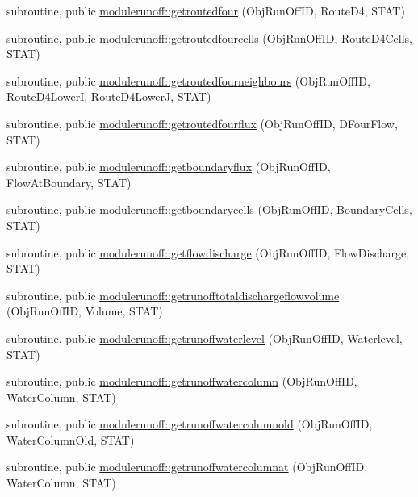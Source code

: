 \begin{DoxyCompactItemize}
\item 
subroutine, public \mbox{\hyperlink{namespacemodulerunoff_a092094d64e7a0ff361f536ab75f67317}{modulerunoff\+::getroutedfour}} (Obj\+Run\+Off\+ID, Route\+D4, S\+T\+AT)
\item 
subroutine, public \mbox{\hyperlink{namespacemodulerunoff_ad1eea51d0c7cb95a4e235e18dad99861}{modulerunoff\+::getroutedfourcells}} (Obj\+Run\+Off\+ID, Route\+D4\+Cells, S\+T\+AT)
\item 
subroutine, public \mbox{\hyperlink{namespacemodulerunoff_a012d41440fbbe25a6de0417a150502fd}{modulerunoff\+::getroutedfourneighbours}} (Obj\+Run\+Off\+ID, Route\+D4\+LowerI, Route\+D4\+LowerJ, S\+T\+AT)
\item 
subroutine, public \mbox{\hyperlink{namespacemodulerunoff_a8e2e0bbd121e81c889fd2cd186c45b5c}{modulerunoff\+::getroutedfourflux}} (Obj\+Run\+Off\+ID, D\+Four\+Flow, S\+T\+AT)
\item 
subroutine, public \mbox{\hyperlink{namespacemodulerunoff_aa5c3e304953e0e305461bb0ef472e0f8}{modulerunoff\+::getboundaryflux}} (Obj\+Run\+Off\+ID, Flow\+At\+Boundary, S\+T\+AT)
\item 
subroutine, public \mbox{\hyperlink{namespacemodulerunoff_a94d1c021f061e9cfa1f07c3845541525}{modulerunoff\+::getboundarycells}} (Obj\+Run\+Off\+ID, Boundary\+Cells, S\+T\+AT)
\item 
subroutine, public \mbox{\hyperlink{namespacemodulerunoff_a35dbdf0f3737830c01b78496fc043851}{modulerunoff\+::getflowdischarge}} (Obj\+Run\+Off\+ID, Flow\+Discharge, S\+T\+AT)
\item 
subroutine, public \mbox{\hyperlink{namespacemodulerunoff_aa4377dd8080b614590e0609f019f9764}{modulerunoff\+::getrunofftotaldischargeflowvolume}} (Obj\+Run\+Off\+ID, Volume, S\+T\+AT)
\item 
subroutine, public \mbox{\hyperlink{namespacemodulerunoff_a739d861fb3d51996841a644f1567506e}{modulerunoff\+::getrunoffwaterlevel}} (Obj\+Run\+Off\+ID, Waterlevel, S\+T\+AT)
\item 
subroutine, public \mbox{\hyperlink{namespacemodulerunoff_a2f62616fa000a8f027d3557454de9b24}{modulerunoff\+::getrunoffwatercolumn}} (Obj\+Run\+Off\+ID, Water\+Column, S\+T\+AT)
\item 
subroutine, public \mbox{\hyperlink{namespacemodulerunoff_a4718c4b469bb2480c20b88afa22ebc29}{modulerunoff\+::getrunoffwatercolumnold}} (Obj\+Run\+Off\+ID, Water\+Column\+Old, S\+T\+AT)
\item 
subroutine, public \mbox{\hyperlink{namespacemodulerunoff_a6f2a352071be64f678c58f0707749d4f}{modulerunoff\+::getrunoffwatercolumnat}} (Obj\+Run\+Off\+ID, Water\+Column, S\+T\+AT)

\end{DoxyCompactItemize}
